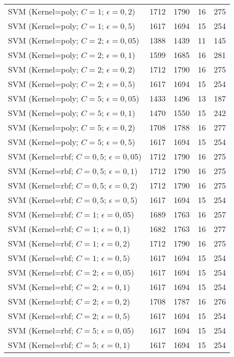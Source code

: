 \begin{center}
\begin{longtable}{|l|l|l|l|l|}
SVM (Kernel=poly; $C=1$; $\epsilon=0,2$) & 1712 & 1790 & 16 & 275 \\
SVM (Kernel=poly; $C=1$; $\epsilon=0,5$) & 1617 & 1694 & 15 & 254 \\
SVM (Kernel=poly; $C=2$; $\epsilon=0,05$) & 1388 & 1439 & 11 & 145 \\
SVM (Kernel=poly; $C=2$; $\epsilon=0,1$) & 1599 & 1685 & 16 & 281 \\
SVM (Kernel=poly; $C=2$; $\epsilon=0,2$) & 1712 & 1790 & 16 & 275 \\
SVM (Kernel=poly; $C=2$; $\epsilon=0,5$) & 1617 & 1694 & 15 & 254 \\
SVM (Kernel=poly; $C=5$; $\epsilon=0,05$) & 1433 & 1496 & 13 & 187 \\
SVM (Kernel=poly; $C=5$; $\epsilon=0,1$) & 1470 & 1550 & 15 & 242 \\
SVM (Kernel=poly; $C=5$; $\epsilon=0,2$) & 1708 & 1788 & 16 & 277 \\
SVM (Kernel=poly; $C=5$; $\epsilon=0,5$) & 1617 & 1694 & 15 & 254 \\
SVM (Kernel=rbf; $C=0,5$; $\epsilon=0,05$) & 1712 & 1790 & 16 & 275 \\
SVM (Kernel=rbf; $C=0,5$; $\epsilon=0,1$) & 1712 & 1790 & 16 & 275 \\
SVM (Kernel=rbf; $C=0,5$; $\epsilon=0,2$) & 1712 & 1790 & 16 & 275 \\
SVM (Kernel=rbf; $C=0,5$; $\epsilon=0,5$) & 1617 & 1694 & 15 & 254 \\
SVM (Kernel=rbf; $C=1$; $\epsilon=0,05$) & 1689 & 1763 & 16 & 257 \\
SVM (Kernel=rbf; $C=1$; $\epsilon=0,1$) & 1682 & 1763 & 16 & 277 \\
SVM (Kernel=rbf; $C=1$; $\epsilon=0,2$) & 1712 & 1790 & 16 & 275 \\
SVM (Kernel=rbf; $C=1$; $\epsilon=0,5$) & 1617 & 1694 & 15 & 254 \\
SVM (Kernel=rbf; $C=2$; $\epsilon=0,05$) & 1617 & 1694 & 15 & 254 \\
SVM (Kernel=rbf; $C=2$; $\epsilon=0,1$) & 1617 & 1694 & 15 & 254 \\
SVM (Kernel=rbf; $C=2$; $\epsilon=0,2$) & 1708 & 1787 & 16 & 276 \\
SVM (Kernel=rbf; $C=2$; $\epsilon=0,5$) & 1617 & 1694 & 15 & 254 \\
SVM (Kernel=rbf; $C=5$; $\epsilon=0,05$) & 1617 & 1694 & 15 & 254 \\
SVM (Kernel=rbf; $C=5$; $\epsilon=0,1$) & 1617 & 1694 & 15 & 254 \\

\end{longtable}
\end{center}

